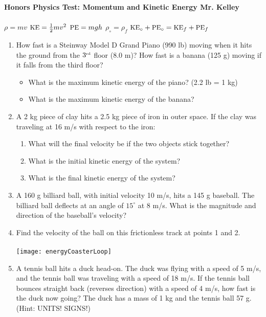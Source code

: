 \documentclass[12pt]{report}
\newcommand{\ke}{\mbox{\small KE}}
\newcommand{\pe}{\mbox{\small PE}}
\begin{document}
{\bf{Honors Physics} \hfill {Test: Momentum and Kinetic Energy} \hfill {Mr. Kelley}} \\ \\
$\rho=mv$ \hfill $\ke=\frac{1}{2}mv^2$ \hfill $\pe=mgh$ \hfill $\rho_\circ = \rho_f$ \hfill $\ke_\circ + \pe_\circ = \ke_f + \pe_f$


\begin{enumerate}
\item How fast is a Steinway Model D Grand Piano (990 lb) moving when it hits the ground from the $3^{\mbox{\tiny rd}}$ floor (8.0 m)?  How fast is a banana (125 g) moving if it falls from the third floor?
\vspace{5cm}
\begin{itemize}
\item What is the maximum kinetic energy of the piano?  (2.2 lb = 1 kg)
\vspace{3cm}
\item What is the maximum kinetic energy of the banana?
\vspace{3cm}
\end{itemize} 

\item A 2 kg piece of clay hits a 2.5 kg piece of iron in outer space.  If the clay was traveling at 16 m/s with respect to the iron:
\begin{enumerate}
\item What will the final velocity be if the two objects stick together?
\pagebreak
\item What is the initial kinetic energy of the system?
\vspace{3cm}
\item What is the final kinetic energy of the system?
\vspace{3cm}
\end{enumerate}

\item A 160 g billiard ball, with initial velocity 10 m/s, hits a 145 g baseball.  The billiard ball deflects at an angle of $15^\circ$ at 8 m/s.  What is the magnitude and direction of the baseball's velocity?
\pagebreak

\item  Find the velocity of the ball on this frictionless track at points 1 and 2. \\ \\
{\texttt{[image: energyCoasterLoop]}}
\vspace{5cm}

\item A tennis ball hits a duck head-on.  The duck was flying with a speed of 5 m/s, and the tennis ball was traveling with a speed of 18 m/s.  If the tennis ball bounces straight back (reverses direction) with a speed of 4 m/s, how fast is the duck now going?  The duck has a mass of 1 kg and the tennis ball 57 g.  (Hint: UNITS! SIGNS!)
\pagebreak


\end{enumerate}
\end{document}
